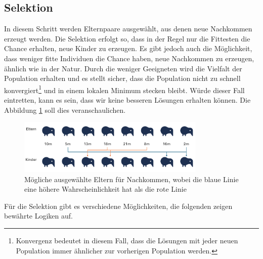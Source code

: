 %
%
%
%
\subsection{Selektion
\label{buch:paper:varalg:subsection:selection}}
In diesem Schritt werden Elternpaare ausgewählt, aus denen neue 
Nachkommen erzeugt werden. Die Selektion erfolgt so, dass in der 
Regel nur die Fittesten die Chance erhalten, neue Kinder zu erzeugen. 
Es gibt jedoch auch die Möglichkeit, dass weniger fitte Individuen die 
Chance haben, neue Nachkommen zu erzeugen, ähnlich wie in der Natur.
Durch die weniger Geeigneten wird die Vielfalt der Population erhalten
und es stellt sicher, dass die Population nicht zu schnell 
konvergiert\footnote{
    Konvergenz bedeutet in diesem Fall, dass die Lösungen mit jeder neuen 
    Population immer ähnlicher zur vorherigen Population werden.
    }
und in einem lokalen Minimum stecken bleibt. Würde dieser Fall eintretten, 
kann es sein, dass wir keine besseren Lösungen erhalten können. Die Abbildung
\ref{fig:selection_of_parents} soll dies veranschaulichen.
\begin{figure}
    \centering
    \includegraphics[width=0.8\textwidth]{
        papers/varalg/images/teil3/04OffspringProbability.png
    }
    \caption{
        Mögliche ausgewählte Eltern für Nachkommen, wobei die blaue Linie 
        eine höhere Wahrscheinlichkeit hat als die rote Linie}
    \label{fig:selection_of_parents}
\end{figure}
Für die Selektion gibt es verschiedene Möglichkeiten, die folgenden zeigen bewährte
Logiken auf.
